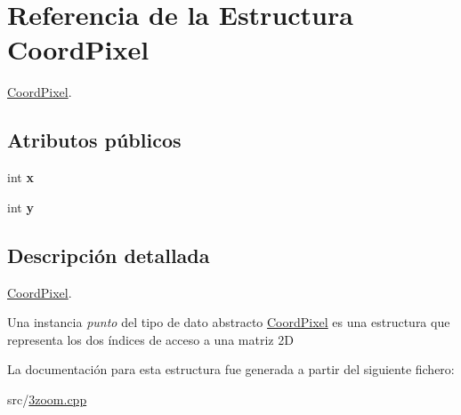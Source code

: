 \hypertarget{structCoordPixel}{}\section{Referencia de la Estructura Coord\+Pixel}
\label{structCoordPixel}


\hyperlink{structCoordPixel}{Coord\+Pixel}.  


\subsection*{Atributos públicos}
\begin{DoxyCompactItemize}
\item 
\mbox{\label{structCoordPixel_a48af11c3d2074522279dd3d2ad9c03e9}} 
int {\bfseries x}
\item 
\mbox{\label{structCoordPixel_aeb216024bea571e8bf79ac43fdf5206b}} 
int {\bfseries y}
\end{DoxyCompactItemize}


\subsection{Descripción detallada}
\hyperlink{structCoordPixel}{Coord\+Pixel}. 

Una instancia {\itshape punto} del tipo de dato abstracto {\ttfamily \hyperlink{structCoordPixel}{Coord\+Pixel}} es una estructura que representa los dos índices de acceso a una matriz 2D 

La documentación para esta estructura fue generada a partir del siguiente fichero\+:\begin{DoxyCompactItemize}
\item 
src/\hyperlink{3zoom_8cpp}{3zoom.\+cpp}\end{DoxyCompactItemize}
